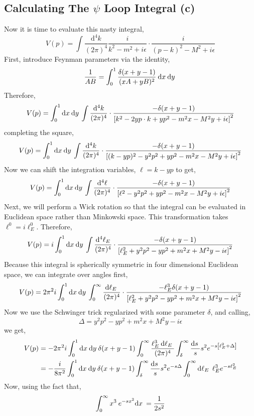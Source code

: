 \documentclass[12pt]{extarticle}
\begin{document}
\subsection{Calculating The $\psi$ Loop Integral (c)}
Now it is time to evaluate this nasty integral,
\[ V(p) = \int \frac{\mathrm{d}^4 k}{(2 \pi)^4} \frac{i}{k^2 - m^2 + i \epsilon} \cdot \frac{i}{(p - k)^2 - M^2 + i \epsilon} \]
First, introduce Feynman parameters via the identity,
\[ \frac{1}{AB} = \int_0^1 \frac{\delta(x+y-1)}{(xA + y B)^2} \: \mathrm{d}x \:\mathrm{d}y \: \] 
Therefore,
\[ V(p) = \int_{0}^{1} \mathrm{d}x \: \mathrm{d}y \: \int \frac{\mathrm{d}^4 k}{(2\pi)^4} \cdot \frac{-\delta(x + y - 1)}{\left[k^2 - 2 y p \cdot k + y p^2 - m^2 x - M^2 y + i \epsilon \right]^2}\]
completing the square,
\[ V(p) = \int_{0}^{1} \mathrm{d}x \: \mathrm{d}y \: \int \frac{\mathrm{d}^4 k}{(2\pi)^4} \cdot \frac{-\delta(x + y - 1)}{\left[(k - y p)^2 - y^2 p^2 + y p^2 - m^2 x - M^2 y + i \epsilon \right]^2}\]
Now we can shift the integration variables, $\ell = k - y p$ to get,
\[ V(p) = \int_{0}^{1} \mathrm{d}x \: \mathrm{d}y \: \int \frac{\mathrm{d}^4 \ell}{(2\pi)^4} \cdot \frac{-\delta(x + y - 1)}{\left[\ell^2 - y^2 p^2 + y p^2 - m^2 x - M^2 y + i \epsilon \right]^2}\]
Next, we will perform a Wick rotation so that the integral can be evaluated in Euclidean space rather than Minkowski space. This transformation takes $\ell^0 = i \ell^0_E$. Therefore, 
\[ V(p) = i \int_{0}^{1} \mathrm{d}x \: \mathrm{d}y \: \int \frac{\mathrm{d}^4 \ell_E}{(2\pi)^4} \cdot \frac{-\delta(x + y - 1)}{\left[\ell_E^2 + y^2 p^2 - y p^2 + m^2 x + M^2 y - i \epsilon \right]^2}\]
Because this integral is spherically symmetric in four dimensional Euclidean space, we can integrate over angles first, 
\[ V(p) = 2 \pi^2 i \int_{0}^{1} \mathrm{d}x \: \mathrm{d}y \: \int_{0}^\infty \frac{\mathrm{d}\ell_E \:}{(2\pi)^4} \cdot \frac{ -\ell_E^3 \delta(x + y - 1)}{\left[\ell_E^2 + y^2 p^2 - y p^2 + m^2 x + M^2 y - i \epsilon \right]^2}\]
Now we use the Schwinger trick regularized with some parameter $\delta$, and calling,
\[\Delta = y^2 p^2 - y p^2 + m^2 x + M^2 y - i \epsilon\]
we get,
\begin{align*}
V(p) & = -2 \pi^2 i \int_{0}^{1} \mathrm{d}x \: \mathrm{d}y \: \delta(x + y - 1) \int_{0}^\infty \frac{\ell_E^3 \: \mathrm{d}\ell_E \: }{(2\pi)^4} \int_{\delta}^\infty \frac{\mathrm{d}s \:}{s} s^2 e^{ - s \left[  \ell_E^2 + \Delta \right] } 
\\
& = -\frac{i}{8 \pi^2} \int_{0}^{1} \mathrm{d}x \: \mathrm{d}y \: \delta(x + y - 1) \int_{\delta}^\infty \frac{\mathrm{d}s \:}{s} s^2 e^{ - s \Delta } \int_{0}^\infty \mathrm{d}\ell_E \: \: \ell_E^3 e^{-s \ell_E^2} 
\end{align*} 
Now, using the fact that,
\[ \int_0^\infty x^3 \: e^{-s x^2} \mathrm{d}x \: = \frac{1}{2 s^2} \]
\end{document}
